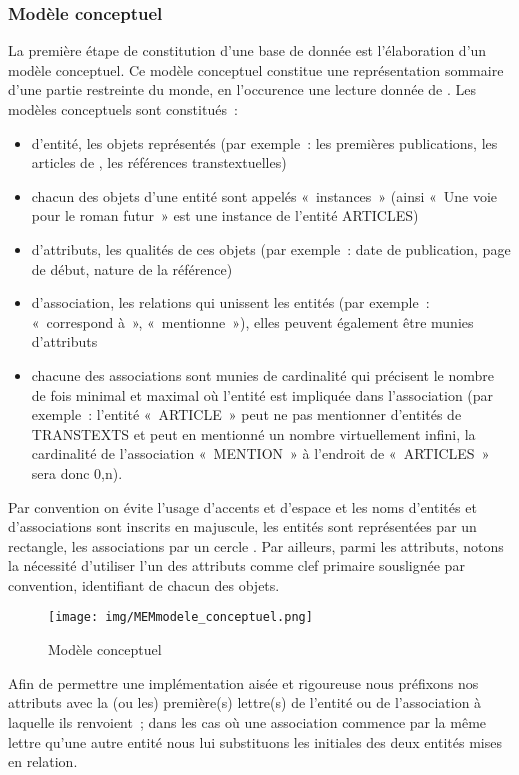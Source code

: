 \documentclass[12pt, a4paper]{article}
\begin{document}
\subsubsection{Modèle conceptuel}
\label{ref:db_modele_conceptuel}
 La première étape de constitution d'une base de donnée est l'élaboration d'un modèle conceptuel. Ce modèle conceptuel constitue une représentation sommaire d'une partie restreinte du monde, en l'occurence une lecture donnée de \punr%
 . Les modèles conceptuels sont constitués~: 
    \begin{itemize}
        \item d'entité, les objets représentés (par exemple~: les premières publications, les articles de \punr{}, les références transtextuelles)
        \item chacun des objets d'une entité sont appelés «~instances~» (ainsi «~Une voie pour le roman futur~» est une instance de l'entité ARTICLES)
        \item d'attributs, les qualités de ces objets (par exemple~: date de publication, page de début, nature de la référence)
        \item d'association, les relations qui unissent les entités (par exemple~: «~correspond à~», «~mentionne~»), elles peuvent également être munies d'attributs
        \item chacune des associations sont munies de cardinalité qui précisent le nombre de fois minimal et maximal où l’entité est impliquée dans l’association (par exemple~: l'entité «~ARTICLE~» peut ne pas mentionner d'entités de TRANSTEXTS et peut en mentionné un nombre virtuellement infini, la cardinalité de l'association «~MENTION~» à l'endroit de «~ARTICLES~» sera donc 0,n).
    \end{itemize}
    Par convention on évite l'usage d'accents et d'espace et les noms d'entités et d'associations sont inscrits en majuscule, les entités sont représentées par un rectangle, les associations par un cercle%
    . Par ailleurs, parmi les attributs, notons la nécessité d'utiliser l'un des attributs comme clef primaire souslignée par convention, identifiant de chacun des objets.


\begin{figure}[H]
    \centering
    \texttt{[image: img/MEMmodele\_conceptuel.png]}
    \caption{Modèle conceptuel}
    \label{concept}
\end{figure}
Afin de permettre une implémentation aisée et rigoureuse nous préfixons nos attributs avec la (ou les) première(s) lettre(s) de l'entité ou de l'association à laquelle ils renvoient~; dans les cas où une association commence par la même lettre qu'une autre entité nous lui substituons les initiales des deux entités mises en relation.
\end{document}
